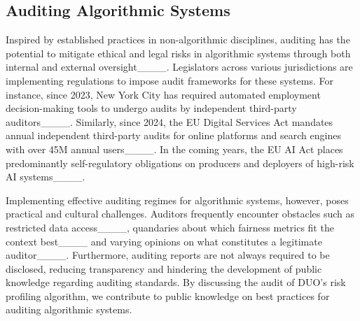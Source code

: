 \subsection{Auditing Algorithmic Systems}
Inspired by established practices in non-algorithmic disciplines, auditing has the potential to mitigate ethical and legal risks in algorithmic systems through both internal and external oversight____. Legislators across various jurisdictions are implementing regulations to impose audit frameworks for these systems. For instance, since 2023, New York City has required automated employment decision-making tools to undergo audits by independent third-party auditors____. Similarly, since 2024, the EU Digital Services Act mandates annual independent third-party audits for online platforms and search engines with over 45M annual users____. In the coming years, the EU AI Act places predominantly self-regulatory obligations on producers and deployers of high-risk AI systems____. 

Implementing effective auditing regimes for algorithmic systems, however, poses practical and cultural challenges. Auditors frequently encounter obstacles such as restricted data access____, quandaries about which fairness metrics fit the context best____ and varying opinions on what constitutes a legitimate auditor____. Furthermore, auditing reports are not always required to be disclosed, reducing transparency and hindering the development of public knowledge regarding auditing standards. By discussing the audit of DUO's risk profiling algorithm, we contribute to public knowledge on best practices for auditing algorithmic systems.

%